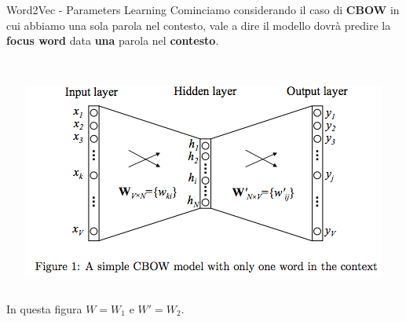 \documentclass[british]{beamer}
\begin{document}
\begin{frame}{Word2Vec - Parameters Learning}
	Cominciamo considerando il caso di \textbf{CBOW} in cui abbiamo una sola parola nel contesto, vale a dire il modello dovr\`{a} predire la \textbf{focus word} data \textbf{\alert{una}} parola nel \textbf{contesto}.
	\\~\\
	\begin{columns}
		\begin{column}{0.15\textwidth}
		
		\end{column}
		\begin{column}{0.7\textwidth}
			\includegraphics[width=1\linewidth,height=0.55\textwidth]{./Imgs/cbow_onecontext}
		\end{column}
		\begin{column}{0.15\textwidth}
		
		\end{column}
	\end{columns}
	In questa figura \(W = W_1\) e \(W' = W_2\).
\end{frame}
\end{document}
